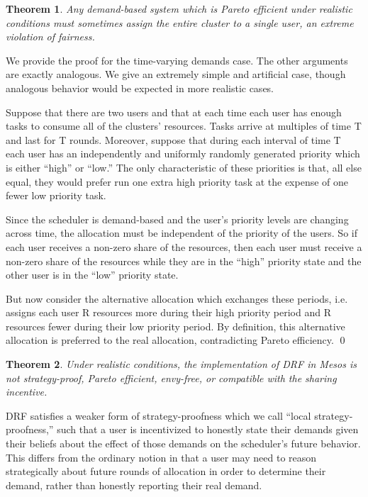 \documentclass{acm_proc_article-sp}
\newtheorem{theorem}{Theorem}[section]
\newenvironment{pproof}[1][Proof]{\begin{trivlist}
\item[\hskip \labelsep {\bfseries #1}]}{\end{trivlist}}
\begin{document}
\begin{theorem}\label{demand-bad}
Any demand-based system which is Pareto efficient under realistic conditions must sometimes assign the entire cluster to a single user, an extreme violation of fairness.
\end{theorem}

\begin{pproof}
We provide the proof for the time-varying demands case. The other arguments are exactly analogous. We give an extremely simple and artificial case, though analogous behavior would be expected in more realistic cases.

Suppose that there are two users and that at each time each user has enough tasks to consume all of the clusters' resources. Tasks arrive at multiples of time T and last for T rounds. Moreover, suppose that during each interval of time T each user has an independently and uniformly randomly generated priority which is either ``high'' or ``low.'' The only characteristic of these priorities is that, all else equal, they would prefer run one extra high priority task at the expense of one fewer low priority task.

Since the scheduler is demand-based and the user's priority levels are changing across time, the allocation must be independent of the priority of the users. So if each user receives a non-zero share of the resources, then each user must receive a non-zero share of the resources while they are in the ``high'' priority state and the other user is in the ``low'' priority state. 

But now consider the alternative allocation which exchanges these periods, i.e. assigns each user R resources more during their high priority period and R resources fewer during their low priority period. By definition, this alternative allocation is preferred to the real allocation, contradicting Pareto efficiency.
\qed
\end{pproof}

\begin{theorem}
Under realistic conditions, the implementation of DRF in Mesos is not strategy-proof, Pareto efficient, envy-free, or compatible with the sharing incentive. 
\end{theorem}

DRF satisfies a weaker form of strategy-proofness which we call ``local strategy-proofness,'' 
such that a user is incentivized to honestly state their demands given their beliefs about the effect of those demands on the scheduler's future behavior. 
This differs from the ordinary notion in that a user may need to reason strategically about future rounds of allocation in order to determine
their demand, rather than honestly reporting their real demand.
\end{document}
